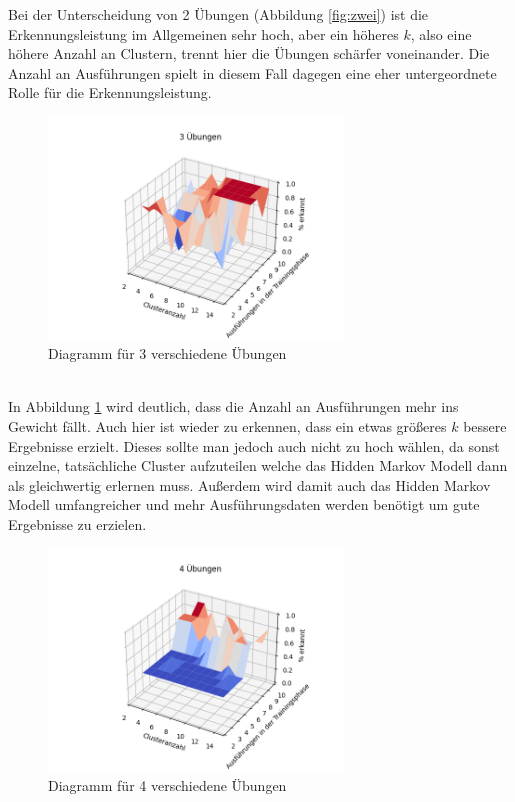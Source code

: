 \documentclass{article}
\begin{document}
Bei der Unterscheidung von 2 Übungen (Abbildung \ref{fig:zwei}) ist die Erkennungsleistung im Allgemeinen sehr hoch, aber ein höheres $k$, also eine höhere Anzahl an Clustern, trennt hier die Übungen schärfer voneinander.
Die Anzahl an Ausführungen spielt in diesem Fall dagegen eine eher untergeordnete Rolle für die Erkennungsleistung.
\medskip
\begin{figure}[h]
\centering
\includegraphics[width=0.7\textwidth]{figures/3_graph.png}
\caption{Diagramm für 3 verschiedene Übungen}
\label{fig:drei}
\end{figure}\\
In Abbildung \ref{fig:drei} wird deutlich, dass die Anzahl an Ausführungen mehr ins Gewicht fällt.
Auch hier ist wieder zu erkennen, dass ein etwas größeres $k$ bessere Ergebnisse erzielt.
Dieses sollte man jedoch auch nicht zu hoch wählen, da sonst einzelne, tatsächliche Cluster aufzuteilen welche das Hidden Markov Modell dann als gleichwertig erlernen muss.
Außerdem wird damit auch das Hidden Markov Modell umfangreicher und mehr Ausführungsdaten werden benötigt um gute Ergebnisse zu erzielen.\\
\medskip
\begin{figure}[htbp]
\centering
\includegraphics[width=0.7\textwidth]{figures/4_graph.png}
\caption{Diagramm für 4 verschiedene Übungen}
\label{fig:vier}
\end{figure}\\
\end{document}
